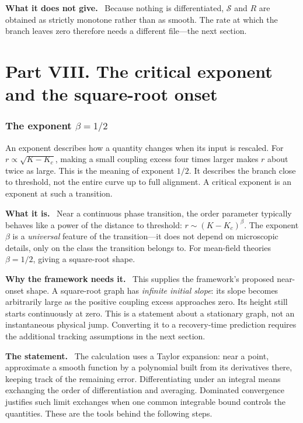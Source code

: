 \documentclass[11pt]{article}
\newcommand{\what}{\par\smallskip\noindent\textbf{What it is.}\ }
\newcommand{\why}{\par\smallskip\noindent\textbf{Why the framework needs it.}\ }
\newcommand{\statement}{\par\smallskip\noindent\textbf{The statement.}\ }
\newcommand{\scope}{\par\smallskip\noindent\textbf{What it does not give.}\ }
\newcommand{\Kc}{K_{c}}
\begin{document}
\scope
Because nothing is differentiated, $\mathcal{S}$ and $R$ are obtained as strictly
monotone rather than as smooth. The rate at which the branch leaves zero
therefore needs a different file---the next section.

\part*{Part VIII. The critical exponent and the square-root onset}
\section{The exponent \texorpdfstring{$\beta=1/2$}{beta = 1/2}}
\label{sec:exponent}

An exponent describes how a quantity changes when its input is rescaled.
For $r\propto\sqrt{K-K_c}$, making a small coupling excess four times larger
makes $r$ about twice as large. This is the meaning of exponent $1/2$.
It describes the branch close to threshold, not the entire curve up to full
alignment. A critical exponent is an exponent at such a transition.

\what
Near a continuous phase transition, the order parameter typically behaves like
a power of the distance to threshold:
$r\sim(K-\Kc)^{\beta}$. The exponent $\beta$ is a \emph{universal} feature of
the transition---it does not depend on microscopic details, only on the class
the transition belongs to. For mean-field theories $\beta=1/2$, giving a
square-root shape.

\why
This supplies the framework's proposed near-onset shape. A square-root graph
has \emph{infinite initial slope}: its slope becomes arbitrarily large as the
positive coupling excess approaches zero. Its height still starts continuously
at zero. This is a statement about a stationary graph, not an instantaneous
physical jump. Converting it to a recovery-time prediction requires the
additional tracking assumptions in the next section.

\statement
The calculation uses a Taylor expansion: near a point, approximate a smooth
function by a polynomial built from its derivatives there, keeping track of
the remaining error. Differentiating under an integral means exchanging the
order of differentiation and averaging. Dominated convergence justifies such
limit exchanges when one common integrable bound controls the quantities.
These are the tools behind the following steps.
\end{document}
